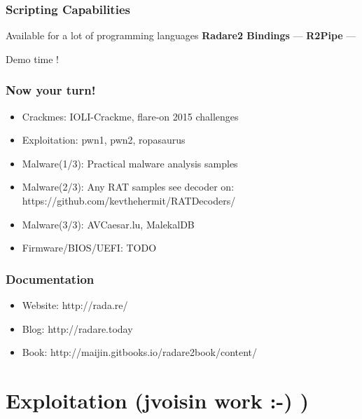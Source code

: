 \documentclass[10pt, compress]{beamer}
\begin{document}
\begin{frame}[fragile]
  \frametitle{Scripting Capabilities}
  \center Available for a lot of programming languages
  \center\textbf{Radare2 Bindings} —
  \center\textbf{R2Pipe} —
  \noindent\makebox[\linewidth]{\rule{\paperwidth}{0.4pt}}
  \item Demo time !
\end{frame}

\begin{frame}[fragile]
  \frametitle{Now your turn!}
    \begin{itemize}
    \item \alert{Crackmes:} IOLI-Crackme, flare-on 2015 challenges
    \item \alert{Exploitation:} pwn1, pwn2, ropasaurus
    \item \alert{Malware(1/3):} Practical malware analysis samples
    \item \alert{Malware(2/3):} Any RAT samples see decoder on: https://github.com/kevthehermit/RATDecoders/
    \item \alert{Malware(3/3):} AVCaesar.lu, MalekalDB
    \item \alert{Firmware/BIOS/UEFI:} TODO
    \end{itemize}
\end{frame}

\begin{frame}[fragile]
  \frametitle{Documentation}
    \begin{itemize}
    \item \alert{Website:} http://rada.re/
    \item \alert{Blog:} http://radare.today
    \item \alert{Book:} http://maijin.gitbooks.io/radare2book/content/
    \end{itemize}
\end{frame}

\section{Exploitation (jvoisin work :-) )}
\end{document}
